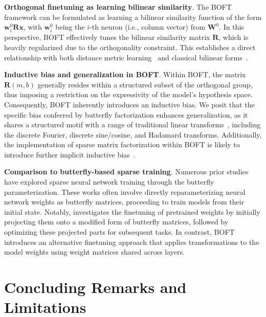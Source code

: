 \textbf{Orthogonal finetuning as learning bilinear similarity}. The BOFT framework can be formulated as learning a bilinear similarity function of the form $\bm{w}^0_i\bm{R}\bm{x}$, with $\bm{w}^0_i$ being the $i$-th neuron (i.e., column vector) from $\bm{W}^0$. In this perspective, BOFT effectively tunes the bilinear similarity matrix $\bm{R}$, which is heavily regularized due to the orthogonality constraint. This establishes a direct relationship with both distance metric learning~\cite{xing2002distance} and classical bilinear forms~\cite{roman2005advanced}.

\textbf{Inductive bias and generalization in BOFT}. Within BOFT, the matrix $\bm{R}(m,b)$ generally resides within a structured subset of the orthogonal group, thus imposing a restriction on the expressivity of the model's hypothesis space. Consequently, BOFT inherently introduces an inductive bias. We posit that the specific bias conferred by butterfly factorization enhances generalization, as it shares a structured motif with a range of traditional linear transforms~\cite{dao2019kaleidoscope}, including the discrete Fourier, discrete sine/cosine, and Hadamard transforms. Additionally, the implementation of sparse matrix factorization within BOFT is likely to introduce further implicit inductive bias~\cite{gunasekar2017implicit,li2018algorithmic,liu2019neural}.

\textbf{Comparison to butterfly-based sparse training}. Numerous prior studies~\cite{dao2019learning,dao2019kaleidoscope,chen2022pixelated,dao2022monarch} have explored sparse neural network training through the butterfly parameterization. These works often involve directly reparameterizing neural network weights as butterfly matrices, proceeding to train models from their initial state. Notably, \cite{dao2022monarch} investigates the finetuning of pretrained weights by initially projecting them onto a modified form of butterfly matrices, followed by optimizing these projected parts for subsequent tasks. In contrast, BOFT introduces an alternative finetuning approach that applies transformations to the model weights using weight matrices shared across layers.



\section{Concluding Remarks and Limitations}

